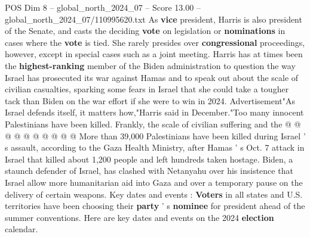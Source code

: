 \begin{textsample}{POS Dim 8 – global\_north\_2024\_07 – Score 13.00 – global\_north\_2024\_07/110995620.txt}
As \textbf{vice} president, Harris is also president of the Senate, and casts the deciding \textbf{vote} on legislation or \textbf{nominations} in cases where the \textbf{vote} is tied.
She rarely presides over \textbf{congressional} proceedings, however, except in special cases such as a joint meeting.
Harris has at times been the \textbf{highest-ranking} member of the Biden administration to question the way Israel has prosecuted its war against Hamas and to speak out about the scale of civilian casualties, sparking some fears in Israel that she could take a tougher tack than Biden on the war effort if she were to win in 2024.
Advertisement"As Israel defends itself, it matters how,"Harris said in December."Too many innocent Palestinians have been killed.
Frankly, the scale of civilian suffering and the @ @ @ @ @ @ @ @ @ @ More than 39,000 Palestinians have been killed during Israel ' s assault, according to the Gaza Health Ministry, after Hamas ' s Oct. 7 attack in Israel that killed about 1,200 people and left hundreds taken hostage.
Biden, a staunch defender of Israel, has clashed with Netanyahu over his insistence that Israel allow more humanitarian aid into Gaza and over a temporary pause on the delivery of certain weapons.
Key dates and events : \textbf{Voters} in all states and U.S. territories have been choosing their \textbf{party} ' s \textbf{nominee} for president ahead of the summer conventions.
Here are key dates and events on the 2024 \textbf{election} calendar.

\end{textsample}
